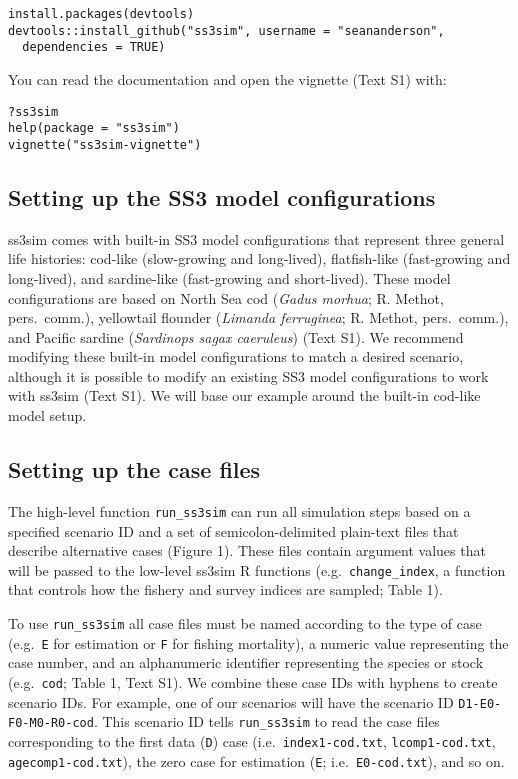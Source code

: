 \documentclass[10pt]{article}
\begin{document}
\begin{verbatim}
install.packages(devtools)
devtools::install_github("ss3sim", username = "seananderson",
  dependencies = TRUE)
\end{verbatim}

\noindent
You can read the documentation and open the vignette (Text S1) with:

\begin{verbatim}
?ss3sim
help(package = "ss3sim")
vignette("ss3sim-vignette")
\end{verbatim}

\subsection*{Setting up the SS3 model configurations}

ss3sim comes with built-in SS3 model configurations that represent three general life histories: cod-like (slow-growing and long-lived), flatfish-like (fast-growing and long-lived), and sardine-like (fast-growing and short-lived). These model configurations are based on North Sea cod (\emph{Gadus morhua}; R. Methot, pers.~comm.), yellowtail flounder (\emph{Limanda ferruginea}; R. Methot, pers.~comm.), and Pacific sardine (\emph{Sardinops sagax caeruleus}) \cite{hill2012} (Text S1). We recommend modifying these built-in model configurations to match a desired scenario, although it is possible to modify an existing SS3 model configurations to work with ss3sim (Text S1). We will base our example around the built-in cod-like model setup.

\subsection*{Setting up the case files}

The high-level function \texttt{run\_ss3sim} can run all simulation steps based on a specified scenario ID and a set of semicolon-delimited plain-text files that describe alternative cases (Figure 1). These files contain argument values that will be passed to the low-level ss3sim R functions (e.g.~\texttt{change\_index}, a function that controls how the fishery and survey indices are sampled; Table 1).

To use \texttt{run\_ss3sim} all case files must be named according to the type of case (e.g.~\texttt{E} for estimation or \texttt{F} for fishing mortality), a numeric value representing the case number, and an alphanumeric identifier representing the species or stock (e.g.~\texttt{cod}; Table 1, Text S1). We combine these case IDs with hyphens to create scenario IDs. For example, one of our scenarios will have the scenario ID \texttt{D1-E0-F0-M0-R0-cod}. This scenario ID tells \texttt{run\_ss3sim} to read the case files corresponding to the first data (\texttt{D}) case (i.e.~\texttt{index1-cod.txt}, \texttt{lcomp1-cod.txt}, \texttt{agecomp1-cod.txt}), the zero case for estimation (\texttt{E}; i.e.~\texttt{E0-cod.txt}), and so on.
\end{document}
